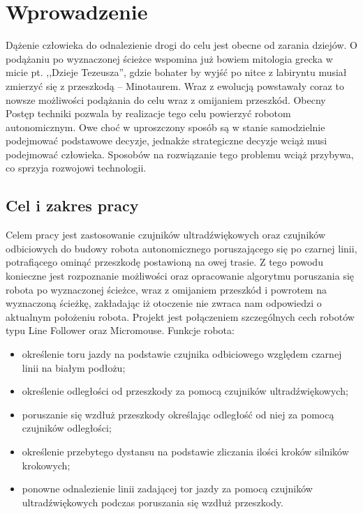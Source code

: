 \chapter{Wprowadzenie}
Dążenie człowieka do odnalezienie drogi do celu jest obecne od zarania dziejów. O podążaniu po wyznaczonej ścieżce wspomina już bowiem mitologia grecka w micie pt. ,,Dzieje Tezeusza'', gdzie bohater by wyjść po nitce z labiryntu musiał zmierzyć się z przeszkodą -- Minotaurem\cite{mitologia}. Wraz z ewolucją powstawały coraz to nowsze możliwości podążania do celu wraz z omijaniem przeszkód. Obecny Postęp techniki pozwala by realizacje tego celu powierzyć robotom autonomicznym. Owe choć w uproszczony sposób są w stanie samodzielnie podejmować podstawowe decyzje, jednakże strategiczne decyzje wciąż musi podejmować człowieka. Sposobów na rozwiązanie tego problemu wciąż przybywa, co sprzyja rozwojowi technologii.
\section{Cel i zakres pracy}
Celem pracy jest zastosowanie czujników ultradźwiękowych oraz czujników odbiciowych do budowy robota autonomicznego poruszającego się po czarnej linii, potrafiącego ominąć przeszkodę postawioną na owej trasie. Z tego powodu konieczne jest rozpoznanie możliwości oraz opracowanie algorytmu poruszania się robota po wyznaczonej ścieżce, wraz z omijaniem przeszkód i powrotem na wyznaczoną ścieżkę, zakładając iż otoczenie nie zwraca nam odpowiedzi o aktualnym położeniu robota. Projekt jest połączeniem szczególnych cech robotów typu Line Follower oraz Micromouse.
Funkcje robota:
\begin{itemize}
    \item określenie toru jazdy na podstawie czujnika odbiciowego względem czarnej linii na białym podłożu;
    \item określenie odległości od przeszkody za pomocą czujników ultradźwiękowych;
    \item poruszanie się wzdłuż przeszkody określając odległość od niej za pomocą czujników odległości;
    \item określenie przebytego dystansu na podstawie zliczania ilości kroków silników krokowych;
    \item ponowne odnalezienie linii zadającej tor jazdy za pomocą czujników ultradźwiękowych podczas poruszania się wzdłuż przeszkody.
\end{itemize}

